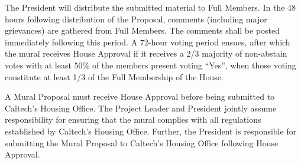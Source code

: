 \documentclass[10pt]{article} %
\begin{document}
The President will distribute the submitted material to Full Members. In the 48 hours following distribution of the Proposal, comments (including major grievances) are gathered from Full Members. The comments shall be posted immediately following this period. A 72-hour voting period ensues, after which the mural receives House Approval if it receives a 2/3 majority of non-abstain votes with at least 50\% of the members present voting ``Yes'', when those voting constitute at least 1/3 of the Full Membership of the House.
        
A Mural Proposal must receive House Approval before being submitted to Caltech's Housing Office. The Project Leader and President jointly assume responsibility for ensuring that the mural complies with all regulations established by Caltech's Housing Office. Further, the President is responsible for submitting the Mural Proposal to Caltech's Housing Office following House Approval.
	
\end{document}
